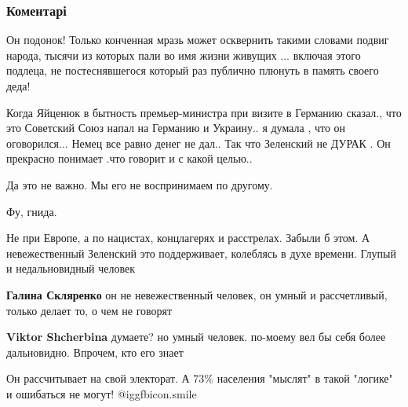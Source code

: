  
 
 
 
 
\subsubsection{Коментарі}

\begin{itemize} %

Он подонок! Только конченная мразь может осквернить такими словами подвиг
народа, тысячи из которых пали во имя жизни живущих ... включая этого подлеца,
не постеснявшегося который раз публично плюнуть в память своего деда!


Когда Яйценюк в бытность премьер-министра при визите в Германию сказал., что
это Советский Союз напал на Германию и Украину.. я думала , что он
оговорился... Немец все равно денег не дал.. Так что Зеленский не ДУРАК . Он
прекрасно понимает .что говорит и с какой целью..

\begin{itemize} %
Да это не важно. Мы его не воспринимаем по другому.
\end{itemize} %

Фу, гнида.


Не при Европе, а по нацистах, концлагерях и расстрелах. Забыли б этом. А
невежественный Зеленский это поддерживает, колеблясь в духе времени. Глупый и
недальновидный человек

\begin{itemize} %
\textbf{Галина Скляренко} он не невежественный человек, он умный и рассчетливый, только делает то, о чем не говорят

\textbf{Viktor Shcherbina} думаете? но умный человек. по-моему вел бы себя более дальновидно. Впрочем, кто его знает
\end{itemize} %


Он рассчитывает на свой электорат. А 73\% населения "мыслят" в такой "логике" и
ошибаться не могут!  @igg{fbicon.smile} 


\end{itemize}

